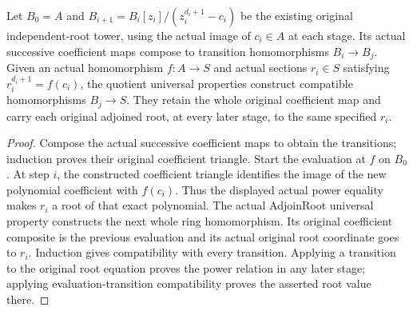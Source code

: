 \begin{lemma}
\label{lem:kn-nadel-kummer-tower-universal}
\leanok
{}
Let $B_0=A$ and $B_{i+1}=B_i[z_i]/(z_i^{d_i+1}-c_i)$ be the
existing original independent-root tower, using the actual image
of $c_i\in A$ at each stage.  Its actual successive coefficient
maps compose to transition homomorphisms $B_i\to B_j$.  Given an
actual homomorphism $f:A\to S$ and actual sections $r_i\in S$
satisfying $r_i^{d_i+1}=f(c_i)$, the quotient universal properties
construct compatible homomorphisms $B_j\to S$.  They retain the
whole original coefficient map and carry each original adjoined
root, at every later stage, to the same specified $r_i$.
\end{lemma}
\begin{proof}
Compose the actual successive coefficient maps to obtain the
transitions; induction proves their original coefficient triangle.
Start the evaluation at $f$ on $B_0$.  At step $i$, the constructed coefficient triangle identifies the image of the new
polynomial coefficient with $f(c_i)$.  Thus the displayed actual
power equality makes $r_i$ a root of that exact polynomial.
The actual AdjoinRoot universal property constructs the next whole
ring homomorphism.  Its original coefficient composite is the
previous evaluation and its actual original root coordinate goes
to $r_i$.  Induction gives compatibility with every transition.
Applying a transition to the original root equation proves the
power relation in any later stage; applying evaluation-transition
compatibility proves the asserted root value there.
\end{proof}

